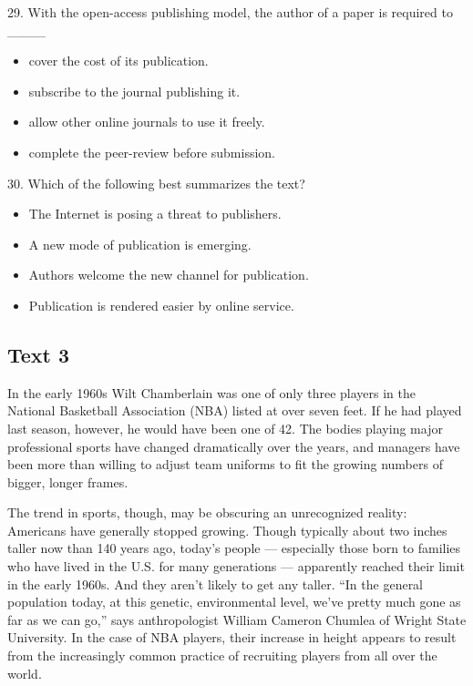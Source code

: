 \documentclass[UTF8,11pt]{ctexart}
\begin{document}
29. With the open-access publishing model, the author of a paper is required to \_\_\_\_


\begin{itemize}[leftmargin=2em,itemsep=.2em,topsep=.4em]\item[A.] cover the cost of its publication.
\item[B.] subscribe to the journal publishing it.
\item[C.] allow other online journals to use it freely.
\item[D.] complete the peer-review before submission.
\end{itemize}

30. Which of the following best summarizes the text?


\begin{itemize}[leftmargin=2em,itemsep=.2em,topsep=.4em]\item[A.] The Internet is posing a threat to publishers.
\item[B.] A new mode of publication is emerging.
\item[C.] Authors welcome the new channel for publication.
\item[D.] Publication is rendered easier by online service.
\end{itemize}

\subsection*{\textbf{Text 3}}


In the early 1960s Wilt Chamberlain was one of only three players in the National Basketball Association (NBA) listed at over seven feet. If he had played last season, however, he would have been one of 42. The bodies playing major professional sports have changed dramatically over the years, and managers have been more than willing to adjust team uniforms to fit the growing numbers of bigger, longer frames.


The trend in sports, though, may be obscuring an unrecognized reality: Americans have generally stopped growing. Though typically about two inches taller now than 140 years ago, today’s people — especially those born to families who have lived in the U.S. for many generations — apparently reached their limit in the early 1960s. And they aren't likely to get any taller. “In the general population today, at this genetic, environmental level, we’ve pretty much gone as far as we can go,” says anthropologist William Cameron Chumlea of Wright State University. In the case of NBA players, their increase in height appears to result from the increasingly common practice of recruiting players from all over the world.
\end{document}
